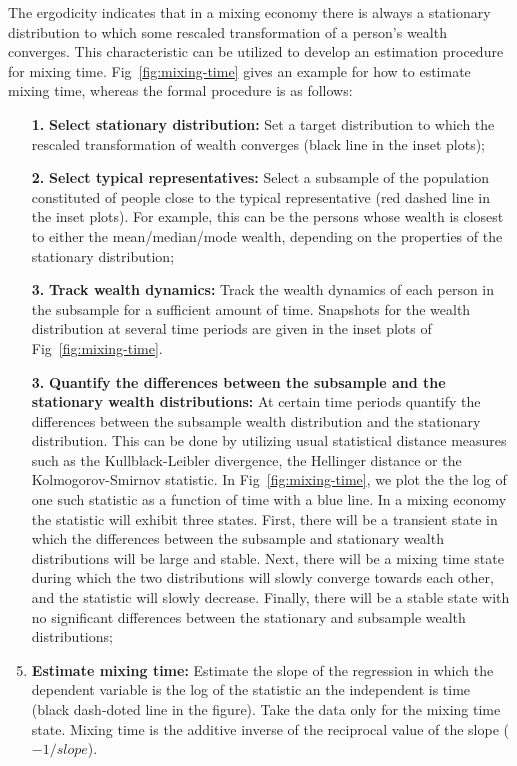 \documentclass[11pt]{article}
\numberwithin{equation}{section}
\begin{document}
The ergodicity indicates that in a mixing economy there is always a stationary distribution to which some rescaled transformation of a person's wealth converges. This characteristic can be utilized to develop an estimation procedure for mixing time. Fig~\ref{fig:mixing-time} gives an example for how to estimate mixing time, whereas the formal procedure is as follows:
\begin{enumerate}
    \item[\textbf{1.}] \textbf{Select stationary distribution:} Set a target distribution to which the rescaled transformation of wealth converges (black line in the inset plots);
    \item[\textbf{2.}] \textbf{Select typical representatives:} Select a subsample of the population constituted of people close to the typical representative (red dashed line in the inset plots). For example, this can be the persons whose wealth is closest to either the mean/median/mode wealth, depending on the properties of the stationary distribution;
    \item[\textbf{3.}] \textbf{Track wealth dynamics:} Track the wealth dynamics of each person in the subsample for a sufficient amount of time. Snapshots for the wealth distribution at several time periods are given in the inset plots of Fig~\ref{fig:mixing-time}.
    \item[\textbf{3.}] \textbf{Quantify the differences between the subsample and the stationary wealth distributions:} At certain time periods quantify the differences between the subsample wealth distribution and the stationary distribution. This can be done by utilizing usual statistical distance measures such as the Kullblack-Leibler divergence, the Hellinger distance or the Kolmogorov-Smirnov statistic. In Fig~\ref{fig:mixing-time}, we plot the the log of one such statistic as a function of time with a blue line. In a mixing economy the statistic will exhibit three states. First, there will be a transient state in which the differences between the subsample and stationary wealth distributions will be large and stable. Next, there will be a mixing time state during which the two distributions will slowly converge towards each other, and the statistic will slowly decrease. Finally, there will be a stable state with no significant differences between the stationary and subsample wealth distributions; 
    \item \textbf{Estimate mixing time:} Estimate the slope of the regression in which the dependent variable is the log of the statistic an the independent is time (black dash-doted line in the figure). Take the data only for the mixing time state. Mixing time is the additive inverse of the reciprocal value of the slope ($-1 / slope$).
\end{enumerate}
\end{document}
